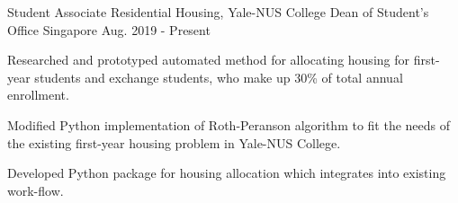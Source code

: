 

\begin{cventries}

  \cventry
  {Student Associate}
  {Residential Housing, Yale-NUS College Dean of Student's Office}
  {Singapore}
  {Aug. 2019 - Present}
  {
    \begin{cvitems}
    \item {Researched and prototyped automated method for allocating housing for
        first-year students and exchange students, who make up 30\% of total
        annual enrollment.}
    \item {Modified Python implementation of Roth-Peranson algorithm to fit the
        needs of the existing first-year housing problem in Yale-NUS College.}
    \item {Developed Python package for housing allocation which integrates into
        existing work-flow.}
    \end{cvitems}
  }
\end{cventries}
